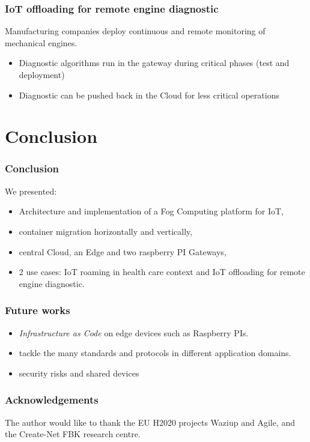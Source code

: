 \documentclass{beamer}
\begin{document}
\begin{frame}
\frametitle{IoT offloading for remote engine diagnostic}
  
  Manufacturing companies deploy continuous and remote monitoring of mechanical engines.
  \begin{itemize}
    \item Diagnostic algorithms run in the gateway during critical phases (test and deployment)
    \item Diagnostic can be pushed back in the Cloud for less critical operations
  \end{itemize}

\end{frame}




\section{Conclusion}

\begin{frame}
\frametitle{Conclusion}
  
  We presented:
  \begin{itemize}
    \item Architecture and implementation of a Fog Computing platform for IoT,
    \item container migration horizontally and vertically,
    \item central Cloud, an Edge and two raspberry PI Gateways,
    \item 2 use cases: IoT roaming in health care context and IoT offloading for remote engine diagnostic.
  \end{itemize}

\end{frame}

\begin{frame}
\frametitle{Future works}

  \begin{itemize}
    \item \emph{Infrastructure as Code} on edge devices such as Raspberry PIs.
    \item tackle the many standards and protocols in different application domains.
    \item security risks and shared devices
  \end{itemize}

\end{frame}

\begin{frame}
\frametitle{Acknowledgements}

The author would like to thank the EU H2020 projects Waziup and Agile, and the Create-Net FBK research centre. \\

\end{frame}
\end{document}
